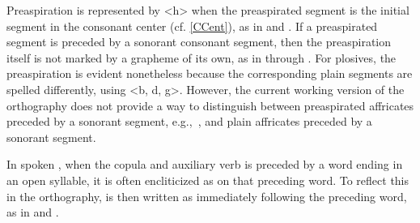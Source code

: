 Preaspiration is represented by <h> when the preaspirated segment is the initial segment in the consonant center (cf. \SEC\ref{CCent}), as in  and . 
\ea\label{spellEx6}
\z
\ea\label{spellEx7}
\z
If a preaspirated segment is preceded by a sonorant consonant segment, then the preaspiration itself is not marked by a grapheme of its own, as in  through .
\ea\label{spellEx8}
\z
\ea\label{spellEx9}
\z
\ea\label{spellEx10}
\z
For plosives, the preaspiration is evident nonetheless because the corresponding plain segments are spelled differently, using <b, d, g>. However, the current working version of the orthography does not provide a way to distinguish between preaspirated affricates preceded by a sonorant segment, e.g.,~, and plain affricates preceded by a sonorant segment. 

In spoken \PS, when the copula and auxiliary verb  is preceded by a word ending in an open syllable, it is often encliticized as  on that preceding word. To reflect this in the orthography,  is then written as  immediately following the preceding word, as in  and . 
\ea\label{IScliticEx1}
\z
\ea\label{IScliticEx2}
\z


